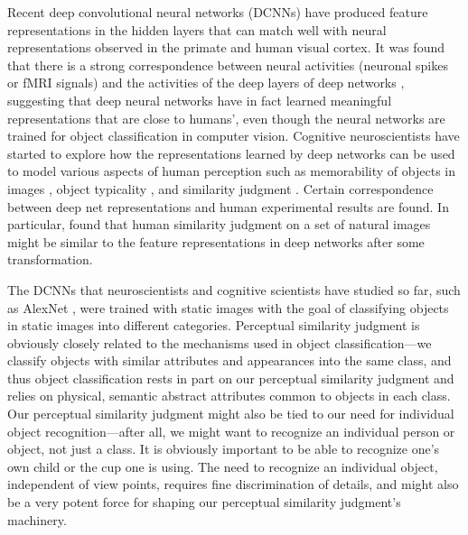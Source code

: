 \documentclass{article} %
\begin{document}
Recent deep convolutional neural networks (DCNNs) have produced feature representations in the hidden layers that can match well with neural representations observed in the primate and human visual cortex. It was found that there is a strong correspondence between neural activities (neuronal spikes or fMRI signals) and the activities of the deep layers of deep networks \citep{Agrawal:2014tw, KhalighRazavi:2014dz, Yamins:2014gi}, suggesting that deep neural networks have in fact learned meaningful representations that are close to humans', even though the neural networks are trained for object classification in computer vision. Cognitive neuroscientists have started to explore how the representations learned by deep networks can be used to model various aspects of human perception such as memorability of objects in images \citep{ICCV15_ObjectMemorability}, object typicality \citep{Lake:2015uj}, and similarity judgment \citep{peterson2016adapting, 10.1371/journal.pcbi.1004896}. Certain correspondence between deep net representations and human experimental results are found. In particular, \citet{peterson2016adapting} found that human similarity judgment on a set of natural images might be similar to the feature representations in deep networks after some transformation.

The DCNNs that neuroscientists and cognitive scientists have studied so far, such as AlexNet \citep{NIPS2012_4824}, were trained with static images with the goal of classifying objects in static images into different categories. Perceptual similarity judgment is obviously closely related to the mechanisms used in object classification---we classify objects with similar attributes and appearances into the same class, and thus object classification rests in part on our perceptual similarity judgment and relies on physical, semantic abstract attributes common to objects in each class. Our perceptual similarity judgment might also be tied to our need for individual object recognition---after all, we might want to recognize an individual person or object, not just a class. It is obviously important to be able to recognize one's own child or the cup one is using. The need to recognize an individual object, independent of view points, requires fine discrimination of details, and might also be a very potent force for shaping our perceptual similarity judgment's machinery.
\end{document}
